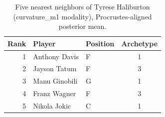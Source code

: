 \begin{table}[htbp]
  \centering\small
  \begin{tabular}{rllc}
    \toprule
    Rank & Player & Position & Archetype \\
    \midrule
    1 & Anthony Davis & F & 1 \\
    2 & Jayson Tatum & F & 3 \\
    3 & Manu Ginobili & G & 1 \\
    4 & Franz Wagner & F & 3 \\
    5 & Nikola Jokic & C & 1 \\
    \bottomrule
  \end{tabular}
  \caption{Five nearest neighbors of Tyrese Haliburton (curvature_m1 modality), Procrustes-aligned posterior mean.}
  \label{tab:Tyrese_Haliburton_neighbors_curvature_m1}
\end{table}

